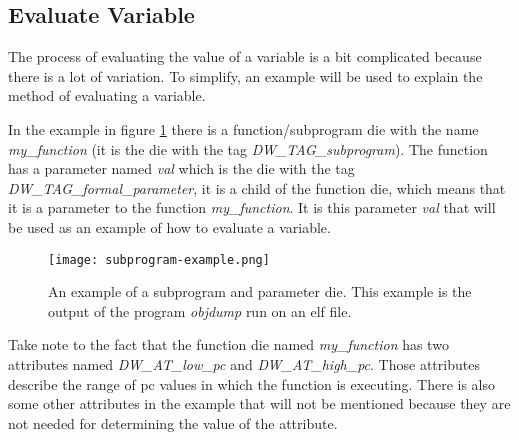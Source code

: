 \subsection{Evaluate Variable}
\label{sec:evaluate-variable}
 


The process of evaluating the value of a variable is a bit complicated because there is a lot of variation.
To simplify, an example will be used to explain the method of evaluating a variable.


In the example in figure \ref{fig:subprogramexample} there is a function/subprogram \gls{die} with the name \emph{my\_function} (it is the \gls{die} with the tag \emph{DW\_TAG\_subprogram}).
The function has a parameter named \emph{val} which is the \gls{die} with the tag \emph{DW\_TAG\_formal\_parameter}, it is a child of the function \gls{die}, which means that it is a parameter to the function \emph{my\_function}.
It is this parameter \emph{val} that will be used as an example of how to evaluate a variable.


\begin{figure}[h]
	\centering
	\texttt{[image: subprogram-example.png]}
	\caption{An example of a subprogram and parameter \gls{die}. This example is the output of the program \emph{objdump} run on an \gls{elf} file.}
	\label{fig:subprogramexample}
\end{figure}


Take note to the fact that the function \gls{die} named \emph{my\_function} has two attributes named \emph{DW\_AT\_low\_pc} and \emph{DW\_AT\_high\_pc}.
Those attributes describe the range of \gls{pc} values in which the function is executing.
There is also some other attributes in the example that will not be mentioned because they are not needed for determining the value of the attribute.


